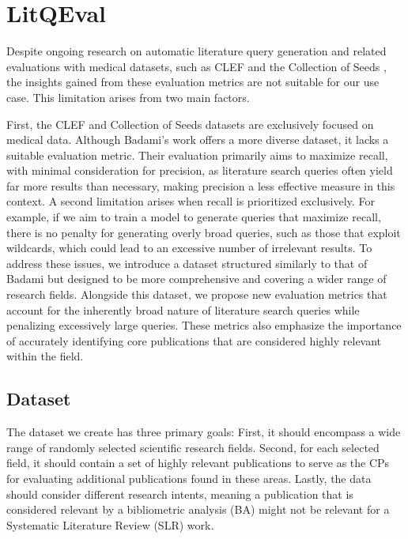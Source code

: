 {\let\clearpage\relax \chapter{LitQEval}\label{ch:ownApproach}}
Despite ongoing research on automatic literature query generation and related evaluations with medical datasets, such as CLEF \autocite{kanoulas2017clef, kanoulas2018clef, kanoulas2019clef} and the Collection of Seeds \autocite{Wang_2022}, the insights gained from these evaluation metrics are not suitable for our use case. This limitation arises from two main factors. 

First, the CLEF and Collection of Seeds datasets are exclusively focused on medical data. Although Badami's work \autocite{badami2023adaptive} offers a more diverse dataset, it lacks a suitable evaluation metric. Their evaluation primarily aims to maximize recall, with minimal consideration for precision, as literature search queries often yield far more results than necessary, making precision a less effective measure in this context. A second limitation arises when recall is prioritized exclusively. For example, if we aim to train a model to generate queries that maximize recall, there is no penalty for generating overly broad queries, such as those that exploit wildcards, which could lead to an excessive number of irrelevant results. To address these issues, we introduce a dataset structured similarly to that of Badami \autocite{badami2023adaptive} but designed to be more comprehensive and covering a wider range of research fields. Alongside this dataset, we propose new evaluation metrics that account for the inherently broad nature of literature search queries while penalizing excessively large queries. These metrics also emphasize the importance of accurately identifying core publications that are considered highly relevant within the field.

\vspace*{0.5cm}\section{Dataset}\label{sec:dataset}
The dataset we create has three primary goals: First, it should encompass a wide range of randomly selected scientific research fields. Second, for each selected field, it should contain a set of highly relevant publications to serve as the CPs for evaluating additional publications found in these areas. Lastly, the data should consider different research intents, meaning a publication that is considered relevant by a bibliometric analysis (BA) might not be relevant for a Systematic Literature Review (SLR) work.

